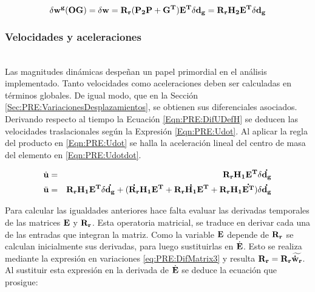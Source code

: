  \begin{equation}\label{Eqn:PRE:AngularBaricentro}
 	\delta \bf{w^g} (OG) =\delta \bf{w} =\bf{R}_r (\bf{P}_2\bf{P}+\bf{G}^T)\bf{E}^T\delta \bf{d}_g = \bf{R}_r\bf{H}_2\bf{E}^T \delta \bf{d}_g
 \end{equation}
 
 
 
\subsubsection{Velocidades y aceleraciones}\label{Sec:PRE:VelAc} ~~\\

Las magnitudes dinámicas despeñan un papel primordial en el análisis implementado. Tanto velocidades como aceleraciones deben ser calculadas en términos globales. De igual modo, que en la Sección \ref{Sec:PRE:VariacionesDesplazamientos}, se obtienen sus diferenciales asociados. Derivando respecto al tiempo la Ecuación \eqref{Eqn:PRE:DifUDefH} se deducen las velocidades traslacionales según la Expresión \eqref{Eqn:PRE:Udot}. Al aplicar la regla del producto en \eqref{Eqn:PRE:Udot} se halla la aceleración lineal del centro de masa del elemento en \eqref{Eqn:PRE:Udotdot}. 

 \begin{eqnarray}
 	\label{Eqn:PRE:Udot}
	\dot{\bf{u}} &=&\bf{R}_r \bf{H}_1 \bf{E}^T \delta \dot{ \bf{d}_g }\\
	\label{Eqn:PRE:Udotdot}
	\ddot{\bf{u}}& = &\bf{R}_r \bf{H}_1 \bf{E}^T \delta \dot{ \bf{d}_g }+ (\dot{\bf{R}_r} \bf{H}_1 \bf{E}^T+\bf{R}_r \dot{\bf{H}_1} \bf{E}^T+\bf{R}_r \bf{H}_1 \dot{\bf{E}^T})\delta \dot{ \bf{d}_g }	
\end{eqnarray}

Para calcular las igualdades anteriores hace falta evaluar las derivadas temporales de las matrices $\bf{E}$ y $\bf{R}_r$. Esta operatoria matricial, se traduce en derivar cada una de las entradas que integran la matriz. Como la variable $\bf{E}$ depende de $\bf{R}_r$ se calculan inicialmente sus derivadas, para luego sustituirlas en $\dot{\bf{E}}$. Esto se realiza mediante la expresión en variaciones \eqref{eq:PRE:DifMatrix3} y resulta $\bf{R}_r=\bf{R_r}\widetilde{\dot{\bf{w}}_r}$. Al sustituir esta expresión en la derivada de $\dot{\bf{E}}$ se deduce la ecuación que prosigue:

